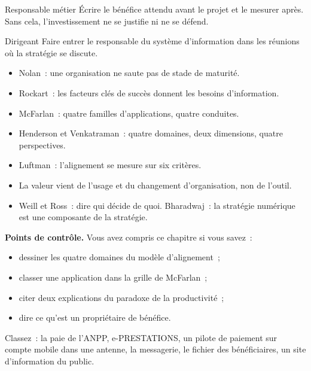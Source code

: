 \begin{boxmetier}{Responsable métier}
Écrire le bénéfice attendu avant le projet et le mesurer après. Sans cela, l'investissement ne se justifie ni ne se défend.
\end{boxmetier}

\begin{boxmetier}{Dirigeant}
Faire entrer le responsable du système d'information dans les réunions où la stratégie se discute.
\end{boxmetier}

\begin{boxresume}
\begin{itemize}
    \item Nolan~: une organisation ne saute pas de stade de maturité.
    \item Rockart~: les facteurs clés de succès donnent les besoins d'information.
    \item McFarlan~: quatre familles d'applications, quatre conduites.
    \item Henderson et Venkatraman~: quatre domaines, deux dimensions, quatre perspectives.
    \item Luftman~: l'alignement se mesure sur six critères.
    \item La valeur vient de l'usage et du changement d'organisation, non de l'outil.
    \item Weill et Ross~: dire qui décide de quoi. Bharadwaj~: la stratégie numérique est une composante de la stratégie.
\end{itemize}
\end{boxresume}

\begin{boxinfo}
\textbf{Points de contrôle.} Vous avez compris ce chapitre si vous savez~:
\begin{itemize}
    \item dessiner les quatre domaines du modèle d'alignement~;
    \item classer une application dans la grille de McFarlan~;
    \item citer deux explications du paradoxe de la productivité~;
    \item dire ce qu'est un propriétaire de bénéfice.
\end{itemize}
\end{boxinfo}

\begin{boxexo}[title={\ding{45}\quad Exercice~3.1. Grille de McFarlan \niveaubase}]
Classez~: la paie de l'ANPP, e-PRESTATIONS, un pilote de paiement sur compte mobile dans une antenne, la messagerie, le fichier des bénéficiaires, un site d'information du public.
\end{boxexo}


